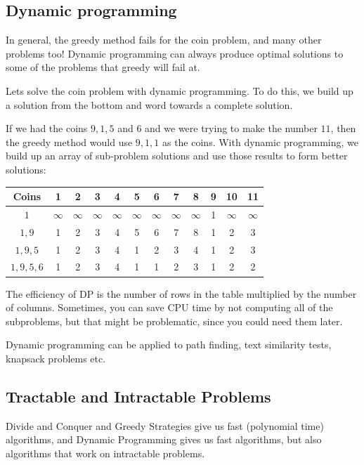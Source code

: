 \subsection{Dynamic programming}

In general, the greedy method fails for the coin problem, and many other
problems too! Dynamic programming can always produce optimal solutions to some
of the problems that greedy will fail at.

Lets solve the coin problem with dynamic programming. To do this, we build up a
solution from the bottom and word towards a complete solution.

If we had the coins $9,1,5$ and $6$ and we were trying to make the number $11$,
then the greedy method would use $9,1,1$ as the coins. With dynamic programming,
we build up an array of sub-problem solutions and use those results to form
better solutions:

\begin{center}
  \begin{tabular}{c | c c c c c c c c c c c}
    Coins & 1 & 2 & 3 & 4 & 5 & 6 & 7 & 8 & 9 & 10 & 11\\ \hline
    $1$   & $\infty$ & $\infty$ & $\infty$ & $\infty$ & $\infty$ & $\infty$ & $\infty$ & $\infty$ & 1 & $\infty$ & $\infty$ \\
    $1,9$ & 1 & 2 & 3 & 4 & 5 & 6 & 7 & 8 & 1 & 2 & 3\\
    $1,9,5$ & 1 & 2 & 3 & 4 & 1 & 2 & 3 & 4 & 1 & 2 & 3\\
    $1,9,5,6$ & 1 & 2 & 3 & 4 & 1 & 1 & 2 & 3 & 1 & 2 & 2\\
  \end{tabular}
\end{center}

The efficiency of DP is the number of rows in the table multiplied by the number
of columns. Sometimes, you can save CPU time by not computing all of the
subproblems, but that might be problematic, since you could need them later.

Dynamic programming can be applied to path finding, text similarity tests,
knapsack problems etc.

\subsection{Tractable and Intractable Problems}

Divide and Conquer and Greedy Strategies give us fast (polynomial time)
algorithms, and Dynamic Programming gives us fast algorithms, but also
algorithms that work on intractable problems.

